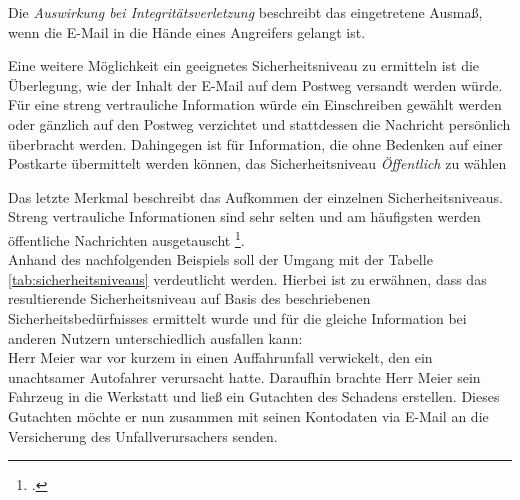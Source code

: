 \documentclass  [paper=a4,
				fontsize=12pt,
				listof=totoc,
				bibliography=totoc
				]{scrreprt}
\begin{document}
		
		Die \textit{Auswirkung bei Integritätsverletzung} beschreibt das eingetretene Ausmaß, wenn die E-Mail in die Hände eines Angreifers gelangt ist.
		
		
		Eine weitere Möglichkeit ein geeignetes Sicherheitsniveau zu ermitteln ist die Überlegung, wie der Inhalt der E-Mail auf dem Postweg versandt werden würde. Für eine streng vertrauliche Information würde ein Einschreiben gewählt werden oder gänzlich auf den Postweg verzichtet und stattdessen die Nachricht persönlich überbracht werden. Dahingegen ist für Information, die ohne Bedenken  auf einer Postkarte übermittelt werden können, das Sicherheitsniveau \textit{Öffentlich} zu wählen 
		
		
		Das letzte Merkmal beschreibt das Aufkommen der einzelnen Sicherheitsniveaus. Streng vertrauliche Informationen sind sehr selten und am häufigsten werden öffentliche Nachrichten ausgetauscht \footcite[Vgl.][]{TSE}.
		\medskip\\
	
		Anhand des nachfolgenden Beispiels soll der Umgang mit der Tabelle \ref{tab:sicherheitsniveaus} verdeutlicht werden. Hierbei ist zu erwähnen, dass das resultierende Sicherheitsniveau auf Basis des beschriebenen Sicherheitsbedürfnisses ermittelt wurde und für die gleiche Information bei anderen Nutzern unterschiedlich ausfallen kann:
		\medskip\\
		
		Herr Meier war vor kurzem in einen Auffahrunfall verwickelt, den ein unachtsamer Autofahrer verursacht hatte. Daraufhin brachte Herr Meier sein Fahrzeug in die Werkstatt und ließ ein Gutachten des Schadens erstellen. Dieses Gutachten möchte er nun zusammen mit seinen Kontodaten via E-Mail an die Versicherung des Unfallverursachers senden. 
		
\end{document}

